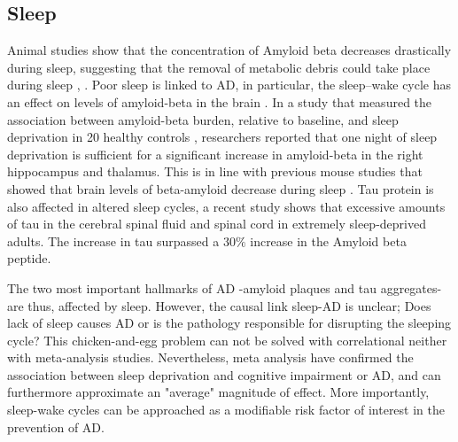 \documentclass[11pt]{article}
\theoremstyle{definition}
\theoremstyle{remark}
\begin{document}


\subsection{Sleep}
\label{ssse:sleep}

Animal studies show that the concentration of Amyloid beta decreases drastically during sleep, suggesting that the removal of metabolic debris could take place during sleep \cite{kang2009amyloid}, \cite{xie2013sleep}. Poor sleep is linked to AD, in particular, the sleep–wake cycle has an effect on levels of amyloid-beta in the brain \cite{ju2014sleep}. In a study that measured the association between amyloid-beta burden, relative to baseline, and sleep deprivation in 20 healthy controls \cite{shokri2018beta}, researchers reported that one night of sleep deprivation is sufficient for a significant increase in amyloid-beta in the right hippocampus and thalamus. This is in line with previous mouse studies that showed that brain levels of beta-amyloid decrease during sleep \cite{xie2013sleep}. Tau protein is also affected in altered sleep cycles, a recent study \cite{holth2019sleep} shows that excessive amounts of tau in the cerebral spinal fluid and spinal cord in extremely sleep-deprived adults. The increase in tau surpassed a $30\%$ increase in the Amyloid beta peptide. 

The two most important hallmarks of AD -amyloid plaques and tau aggregates- are thus, affected by sleep. 
However, the causal link sleep-AD is unclear; Does lack of sleep causes AD or is the pathology responsible for disrupting the sleeping cycle? This chicken-and-egg problem can not be solved with correlational neither with meta-analysis studies. Nevertheless, meta analysis \cite{bubu2016sleep} have confirmed the association between sleep deprivation and cognitive impairment or AD, and can furthermore approximate an "average" magnitude of effect. More importantly, sleep-wake cycles can be approached as a modifiable risk factor of interest in the prevention of AD. 
 
\end{document}
